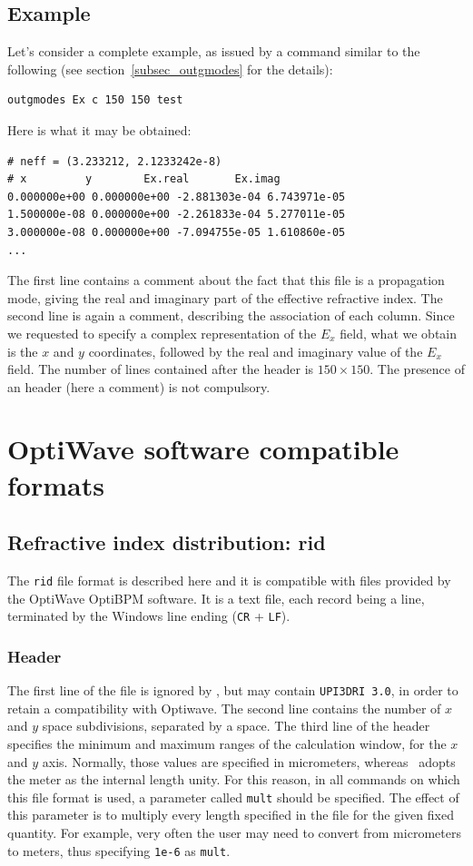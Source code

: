 \subsection{Example}
Let's consider a complete example, as issued by a command similar to the following (see section~\ref{subsec_outgmodes} for the details):
\begin{lstlisting}
outgmodes Ex c 150 150 test
\end{lstlisting}
Here is what it may be obtained:
\begin{verbatim}
# neff = (3.233212, 2.1233242e-8)
# x         y        Ex.real       Ex.imag
0.000000e+00 0.000000e+00 -2.881303e-04 6.743971e-05
1.500000e-08 0.000000e+00 -2.261833e-04 5.277011e-05
3.000000e-08 0.000000e+00 -7.094755e-05 1.610860e-05
...
\end{verbatim}
The first line contains a comment about the fact that this file is a propagation mode, giving the real and imaginary part of the effective refractive index.
The second line is again a comment, describing the association of each column. Since we requested to specify a complex representation of the $E_x$ field, what we obtain is the $x$ and $y$ coordinates, followed by the real and imaginary value of the $E_x$ field.
The number of lines contained after the header is $150\times 150$.
The presence of an header (here a comment) is not compulsory.

\section{OptiWave software compatible formats}
\subsection{Refractive index distribution: rid}
\label{sec_format_rid}
The \lstinline!rid! file format is described here and it is compatible with files provided by the OptiWave OptiBPM software. It is a text file, each record being a line, terminated by the Windows line ending (\lstinline!CR! + \lstinline!LF!).
\subsubsection{Header}
The first line of the file is ignored by \afmm , but may contain \lstinline!UPI3DRI 3.0!, in order to retain a compatibility with Optiwave. 
The second line contains the number of $x$ and $y$ space subdivisions, separated 
by a space. The third line of the header specifies the minimum and maximum ranges of the calculation window, for the $x$ and $y$ axis.
Normally, those values are specified in micrometers, whereas \afmm\ adopts the meter as the internal length unity. For this reason, in all commands on which this file format is used, a parameter called  \lstinline!mult! should be specified. The effect of this parameter is to multiply every length specified in the file for the given fixed quantity. For example, very often the user may need to convert from micrometers to meters, thus specifying \lstinline!1e-6! as \lstinline!mult!.

